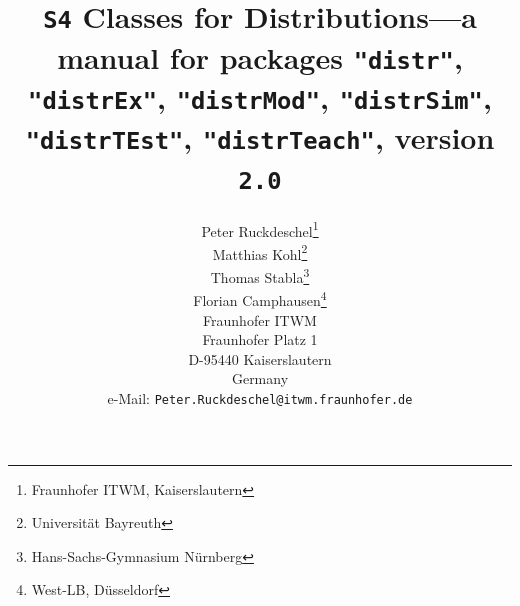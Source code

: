 \documentclass[11pt]{article}
\newcommand{\pkg}[1]{{\tt "#1"}}
\newcommand{\pkgversion}{{\tt 2.0}}
\newcommand{\pkgExversion}{{\tt 2.0}}
\begin{document}
\title{{\tt S4} Classes for Distributions---a manual for packages \pkg{distr}, 
        \pkg{distrEx}, \pkg{distrMod}, \pkg{distrSim}, \pkg{distrTEst}, \pkg{distrTeach}, 
        version \pkgversion}
\author{\small Peter Ruckdeschel\thanks{Fraunhofer ITWM, Kaiserslautern}
\\[-.5ex]
\small Matthias Kohl\thanks{Universit\"at Bayreuth}
\\[-.5ex]
\small Thomas Stabla\thanks{Hans-Sachs-Gymnasium N\"urnberg}
\\[-.5ex]
\small Florian Camphausen\thanks{West-LB, D\"usseldorf}
\smallskip\\
\small Fraunhofer ITWM\\[-.5ex]
\small Fraunhofer Platz 1\\[-.5ex]
\small D-95440 Kaiserslautern\\[-.5ex]
\small Germany\\
\small e-Mail: {\small \tt Peter.Ruckdeschel@itwm.fraunhofer.de}\\
}
\maketitle
\end{document}
